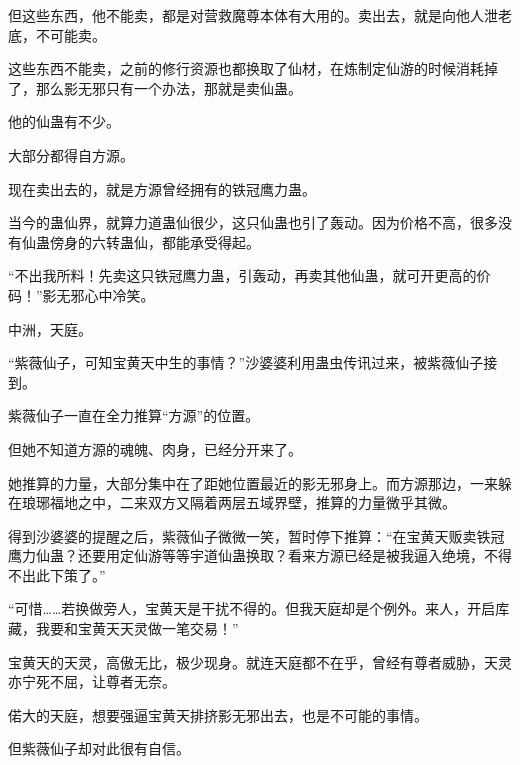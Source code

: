 \begin{this_body}
但这些东西，他不能卖，都是对营救魔尊本体有大用的。卖出去，就是向他人泄老底，不可能卖。

这些东西不能卖，之前的修行资源也都换取了仙材，在炼制定仙游的时候消耗掉了，那么影无邪只有一个办法，那就是卖仙蛊。

他的仙蛊有不少。

大部分都得自方源。

现在卖出去的，就是方源曾经拥有的铁冠鹰力蛊。

当今的蛊仙界，就算力道蛊仙很少，这只仙蛊也引了轰动。因为价格不高，很多没有仙蛊傍身的六转蛊仙，都能承受得起。

“不出我所料！先卖这只铁冠鹰力蛊，引轰动，再卖其他仙蛊，就可开更高的价码！”影无邪心中冷笑。

中洲，天庭。

“紫薇仙子，可知宝黄天中生的事情？”沙婆婆利用蛊虫传讯过来，被紫薇仙子接到。

紫薇仙子一直在全力推算“方源”的位置。

但她不知道方源的魂魄、肉身，已经分开来了。

她推算的力量，大部分集中在了距她位置最近的影无邪身上。而方源那边，一来躲在琅琊福地之中，二来双方又隔着两层五域界壁，推算的力量微乎其微。

得到沙婆婆的提醒之后，紫薇仙子微微一笑，暂时停下推算：“在宝黄天贩卖铁冠鹰力仙蛊？还要用定仙游等等宇道仙蛊换取？看来方源已经是被我逼入绝境，不得不出此下策了。”

“可惜……若换做旁人，宝黄天是干扰不得的。但我天庭却是个例外。来人，开启库藏，我要和宝黄天天灵做一笔交易！”

宝黄天的天灵，高傲无比，极少现身。就连天庭都不在乎，曾经有尊者威胁，天灵亦宁死不屈，让尊者无奈。

偌大的天庭，想要强逼宝黄天排挤影无邪出去，也是不可能的事情。

但紫薇仙子却对此很有自信。

\end{this_body}


